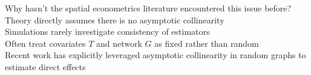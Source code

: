 \documentclass[aspectratio=169]{beamer}
\theoremstyle{remark}
\begin{document}



\begin{frame}{Why hasn't the spatial econometrics literature encountered this issue before?}
    Theory directly assumes there is no asymptotic collinearity \\
    \vspace{3mm}
    Simulations rarely investigate consistency of estimators \\
    \vspace{3mm}
    Often treat covariates $T$ and network $G$ as fixed rather than random \\
    \vspace{6mm}
    \footnotesize *Recent work has explicitly leveraged asymptotic collinearity in random graphs to estimate direct effects \citep{li2022f}
\end{frame}
\end{document}
